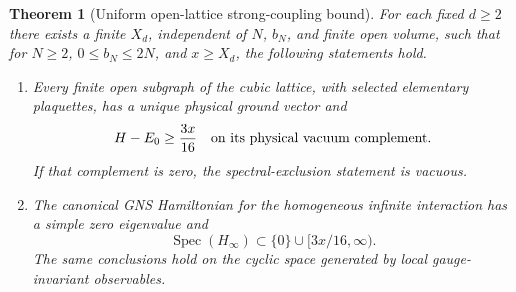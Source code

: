 \documentclass[11pt,letterpaper]{article}
\newcommand{\Spec}{\operatorname{Spec}}
\newtheorem{theorem}{Theorem}[section]
\theoremstyle{definition}
\numberwithin{equation}{section}
\begin{document}
\begin{theorem}[Uniform open-lattice strong-coupling bound]
For each fixed $d\ge2$ there exists a finite $X_d$, independent of $N$,
$b_N$, and finite open volume, such that for $N\ge2$, $0\le b_N\le2N$,
and $x\ge X_d$, the following statements hold.
\begin{enumerate}
\item Every finite open subgraph of the cubic lattice, with selected
elementary plaquettes, has a unique physical ground vector and
\begin{equation}
 H-E_0\ge\frac{3x}{16}\quad\hbox{on its physical vacuum complement}.
 \label{eq:finite-many-gap}
\end{equation}
If that complement is zero, the spectral-exclusion statement is vacuous.
\item The canonical GNS Hamiltonian for the homogeneous infinite
interaction has a simple zero eigenvalue and
\begin{equation}
 \Spec(H_\infty)\subset\{0\}\cup[3x/16,\infty).
 \label{eq:infinite-gap}
\end{equation}
The same conclusions hold on the cyclic space generated by local
gauge-invariant observables.
\end{enumerate}
\label{thm:uniform-gap}
\end{theorem}
\end{document}
